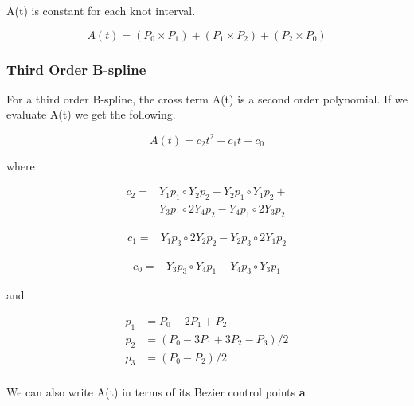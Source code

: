 \documentclass{article}
\begin{document}
    A(t) is constant for each knot interval.

\begin{equation}
A(t) = (P_0 \times P_1) + (P_1 \times P_2) + (P_2 \times P_0)
\end{equation}

\subsubsection{Third Order B-spline}

 For a third order B-spline, the cross term A(t) is a second order polynomial. If we evaluate A(t) we get the following.
 
 \begin{equation} \label{2nd_order_cross_term}
     A(t) = c_2 t^2  + c_1 t + c_0
 \end{equation}
 
 where
 
 \begin{equation}
 \begin{aligned}
     c_2 = & Y_1p_1\circ Y_2 p_2 - Y_2 p_1\circ Y_1p_2 + \\
     & Y_3p_1\circ 2 Y_4 p_2 - Y_4p_1\circ 2 Y_3 p_2
\end{aligned}
 \end{equation}
 
  \begin{equation}
 \begin{aligned}
 c_1 =& Y_1p_3\circ 2 Y_2 p_2 - Y_2 p_3\circ 2 Y_1 p_2
 \end{aligned}
 \end{equation}
 
 \begin{equation}
 \begin{aligned}
 c_0 =& Y_3p_3\circ Y_4p_1  -  Y_4p_3\circ Y_3p_1
 \end{aligned}
 \end{equation}

and 

\begin{equation}
\begin{aligned}
    p_1 &= P_0-2P_1+P_2 \\
    p_2 &= (P_0-3P_1+3P_2-P_3)/2 \\
    p_3 &= (P_0 - P_2)/2\\
\end{aligned}
\end{equation}

 We can also write A(t) in terms of its Bezier control points \textbf{a}.
 
\end{document}
